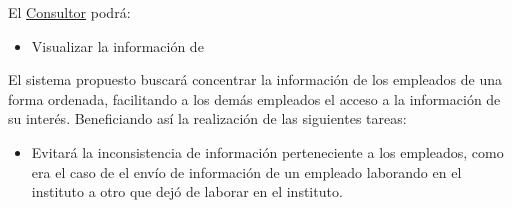 El \hyperlink{UsrDef:Consultor}{Consultor} podrá:
\begin{itemize}
	\item Visualizar la información de 
    \\
\end{itemize}

El sistema propuesto buscará concentrar la información de los empleados de una forma ordenada, facilitando a los demás empleados el acceso a la información de su interés. Beneficiando así la realización de las siguientes tareas:
\begin{itemize}
    \item Evitará la inconsistencia de información perteneciente a los empleados, como era el caso de el envío de información de un empleado laborando en el instituto a otro que dejó de laborar en el instituto.
\end{itemize}